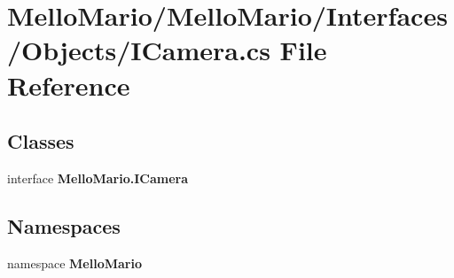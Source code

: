 \section{Mello\+Mario/\+Mello\+Mario/\+Interfaces/\+Objects/\+I\+Camera.cs File Reference}
\label{ICamera_8cs}
\subsection*{Classes}
\begin{DoxyCompactItemize}
\item 
interface \textbf{ Mello\+Mario.\+I\+Camera}
\end{DoxyCompactItemize}
\subsection*{Namespaces}
\begin{DoxyCompactItemize}
\item 
namespace \textbf{ Mello\+Mario}
\end{DoxyCompactItemize}
